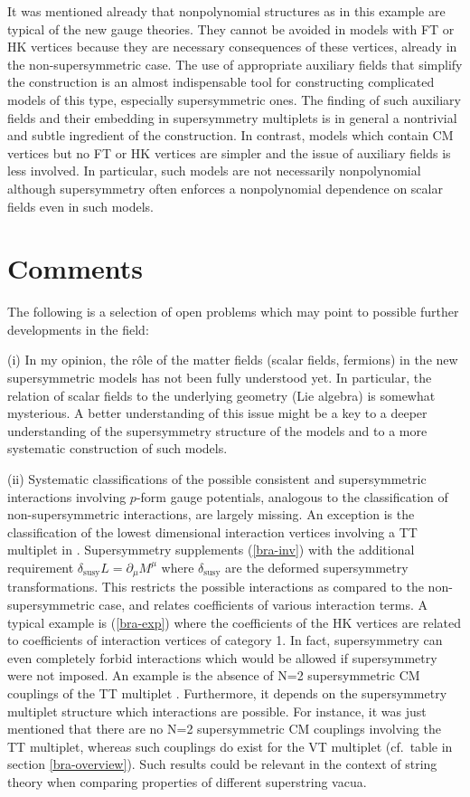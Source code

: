 \documentclass[a4paper,12pt]{article}
\begin{document}
It was mentioned already that nonpolynomial structures as in this
example are typical of the new gauge theories. 
They cannot be avoided in models with
FT or HK vertices because they are
necessary consequences of these vertices, already in the
non-supersymmetric case. The use of appropriate auxiliary
fields that simplify the construction is an almost
indispensable tool for constructing complicated models of this type, 
especially supersymmetric ones. The finding of such
auxiliary fields and their embedding in supersymmetry multiplets
is in general a nontrivial and subtle
ingredient of the construction.
In contrast, models which contain
CM vertices but no FT or HK vertices are simpler
and the issue of auxiliary fields is less involved. In particular,
such models are not necessarily nonpolynomial although
supersymmetry often enforces a nonpolynomial dependence
on scalar fields even in such models.

\section{Comments}\label{bra-comments}

The following is a selection of open problems which may point
to possible further developments in the field:

(i) In my opinion,
the r\^ole of the matter fields (scalar fields, fermions) 
in the new supersymmetric models
has not been fully understood yet.
In particular, the relation of scalar fields to the
underlying geometry (Lie algebra)
is somewhat mysterious. A better understanding of this issue
might be a key to a deeper understanding of the supersymmetry
structure of the models and to a more systematic construction
of such models.

(ii) Systematic classifications of the possible
consistent and supersymmetric interactions involving
$p$-form gauge potentials, analogous to
the classification \cite{bra-HK1,bra-HK2,bra-HK3}
of non-supersymmetric interactions,
are largely missing.
An exception is the classification of the lowest dimensional
interaction vertices involving a TT multiplet in \cite{bra-13}.
Supersymmetry supplements (\ref{bra-inv}) with the 
additional requirement
$\delta_\mathrm{susy}L=\partial _\mu M^\mu$ where $\delta_\mathrm{susy}$
are the deformed supersymmetry transformations.
This restricts the possible
interactions as compared to the non-supersymmetric case, 
and relates coefficients of various interaction terms.
A typical example is (\ref{bra-exp}) where the coefficients of the
HK vertices are related to coefficients of interaction
vertices of category 1.
In fact, supersymmetry can even completely forbid interactions which
would be allowed if supersymmetry were not imposed.
An example is the absence of N=2 supersymmetric
CM couplings of the TT multiplet
\cite{bra-13}. Furthermore, it depends
on the supersymmetry multiplet structure which
interactions are possible. For instance, 
it was just mentioned that there are no N=2 supersymmetric
CM couplings involving the TT multiplet, whereas such couplings
do exist for the VT multiplet (cf.\ table in section \ref{bra-overview}).
Such results could be relevant in the context
of string theory when comparing
properties of different superstring vacua.
\end{document}
